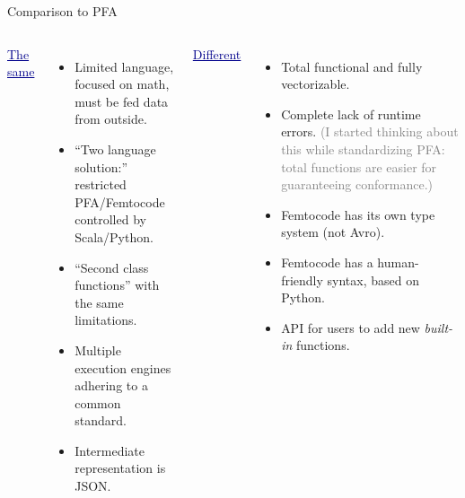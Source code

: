 \documentclass{beamer}
\begin{document}
\begin{frame}{Comparison to PFA}
\vspace{0.3 cm}
\begin{columns}[t]
\textcolor{darkblue}{\underline{The same}}

\begin{itemize}
\item Limited language, focused on math, must be fed data from outside.

\item ``Two language solution:'' restricted PFA/Femtocode controlled by Scala/Python.

\item ``Second class functions'' with the same limitations.

\item Multiple execution engines adhering to a common standard.

\item Intermediate representation is JSON.
\end{itemize}

\textcolor{darkblue}{\underline{Different}}

\begin{itemize}
\item Total functional and fully vectorizable.

\item Complete lack of runtime errors. \textcolor{gray}{\small (I started thinking about this while standardizing PFA: total functions are easier for guaranteeing conformance.)}

\item Femtocode has its own type system (not Avro).

\item Femtocode has a human-friendly syntax, based on Python.

\item API for users to add new {\it built-in} functions.
\end{itemize}

\end{columns}
\end{frame}
\end{document}
